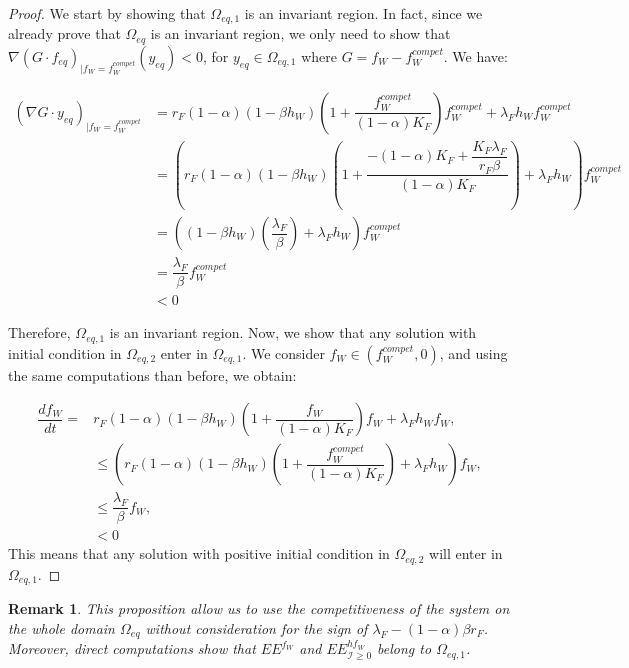 \documentclass{article}
\newcommand{\lfw}{\lambda_{F}}
\newcommand{\lfw}{\lambda_{F}}
\newcommand{\cI}{\mathcal{I}}
\newtheorem{remark}{Remark}
\begin{document}
\begin{proof}
We start by showing that $\Omega_{eq, 1}$ is an invariant region. In fact, since we already prove that $\Omega_{eq}$ is an invariant region, we only need to show that 
$\nabla (G \cdot f_{eq})_{|f_W = f_W^{compet}}(y_{eq}) < 0$, for $y_{eq} \in \Omega_{eq, 1}$ where $G = f_W - f_W^{compet}$. We have:

\begin{align*}
(\nabla G \cdot y_{eq})_{|f_W = f_W^{compet}} &= r_F(1-\alpha)(1-\beta h_W) \left(1 + \dfrac{f_W^{compet}}{(1-\alpha) K_F} \right)f_W^{compet} + \lfw h_W f^{compet}_W \\
&= \left(r_F(1-\alpha)(1-\beta h_W) \left(1 + \dfrac{-(1-\alpha) K_F + \dfrac{K_F \lfw}{r_F \beta}}{(1-\alpha) K_F}\right) + \lfw h_W \right) f^{compet}_W \\
&= \left((1-\beta h_W) \left( \dfrac{\lfw}{\beta}\right) + \lfw h_W \right) f^{compet}_W \\
&= \dfrac{\lfw}{\beta} f_W^{compet} \\
&< 0
\end{align*}

Therefore, $\Omega_{eq, 1}$ is an invariant region. Now, we show that any solution with initial condition in $\Omega_{eq, 2}$ enter in $\Omega_{eq, 1}$. We consider $f_W \in (f_W^{compet}, 0)$, and using the same computations than before, we obtain:

\begin{align*}
\dfrac{df_W}{dt} = &r_F(1-\alpha)(1-\beta h_W) \left(1 + \dfrac{f_W}{(1-\alpha) K_F}\right)f_W + \lfw h_W  f_W, \\
& \leq \left(r_F(1-\alpha)(1-\beta h_W) \left(1 + \dfrac{f_W^{compet}}{(1-\alpha) K_F}\right) + \lfw h_W  \right) f_W, \\
& \leq \dfrac{\lfw}{\beta} f_W,\\
&< 0
\end{align*}
This means that any solution with positive initial condition in $\Omega_{eq, 2}$ will enter in $\Omega_{eq, 1}$.
\end{proof}

\begin{remark} \label{remark:competitivity}
This proposition allow us to use the competitiveness of the system on the whole domain $\Omega_{eq}$ without consideration for the sign of $\lfw - (1-\alpha)\beta r_F$. Moreover, direct computations show that $EE^{f_W}$ and $EE^{hf_W}_{\cI \geq 0}$ belong to $\Omega_{eq, 1}$.
\end{remark}
\end{document}
